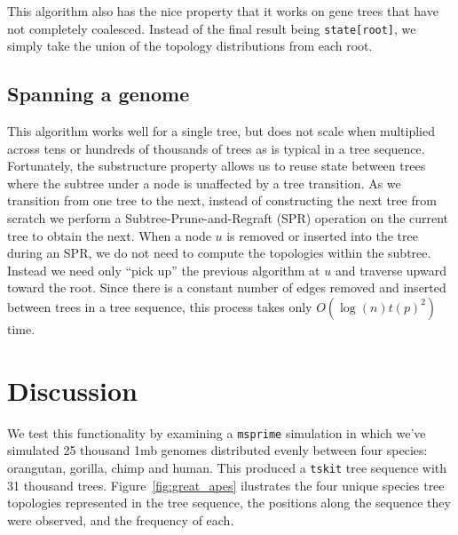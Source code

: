 \documentclass{article}
\newcommand{\tskit}{{\texttt{tskit}}}
\newcommand{\msprime}{{\texttt{msprime}}}
\begin{document}
This algorithm also has the nice property that it works on gene trees
that have not completely coalesced. Instead of the final result being
\texttt{state[root]}, we simply take the union of the topology distributions
from each root.

\subsection{Spanning a genome}
This algorithm works well for a single tree, but does not scale when multiplied
across tens or hundreds of thousands of trees as is typical in a tree sequence.
Fortunately, the substructure property allows us to reuse state between trees
where the subtree under a node is unaffected by a tree transition.
As we transition from one tree to the next, instead of constructing
the next tree from scratch we perform a Subtree-Prune-and-Regraft (SPR) operation
on the current tree to obtain the next.
When a node $u$ is removed or inserted into the tree during an SPR, we do not
need to compute the topologies within the subtree.
Instead we need only ``pick up'' the previous algorithm at $u$ and traverse
upward toward the root.
Since there is a constant number of edges removed and inserted between trees
in a tree sequence, this process takes only $O(\log(n)t(p)^2)$ time.

\section{Discussion}
We test this functionality by examining a \msprime{} simulation in which we've simulated
25 thousand 1mb genomes distributed evenly between four species: orangutan,
gorilla, chimp and human. This produced a \tskit{} tree sequence with
31 thousand trees. Figure~\ref{fig:great_apes} ilustrates the four unique
species tree topologies represented in the tree sequence, the positions
along the sequence they were observed, and the frequency of each.
\end{document}
